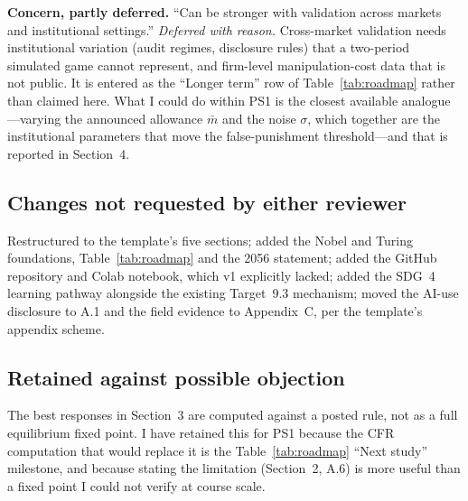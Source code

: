 \textbf{Concern, partly deferred.} ``Can be stronger with validation across
markets and institutional settings.'' \emph{Deferred with reason.} Cross-market
validation needs institutional variation (audit regimes, disclosure rules) that
a two-period simulated game cannot represent, and firm-level manipulation-cost
data that is not public. It is entered as the ``Longer term'' row of
Table~\ref{tab:roadmap} rather than claimed here. What I could do within PS1 is
the closest available analogue---varying the announced allowance $\bar m$ and
the noise $\sigma$, which together are the institutional parameters that move
the false-punishment threshold---and that is reported in Section~4.

\subsection{Changes not requested by either reviewer}
Restructured to the template's five sections; added the Nobel and Turing
foundations, Table~\ref{tab:roadmap} and the 2056 statement; added the GitHub
repository and Colab notebook, which v1 explicitly lacked; added the SDG~4
learning pathway alongside the existing Target~9.3 mechanism; moved the AI-use
disclosure to A.1 and the field evidence to Appendix~C, per the template's
appendix scheme.

\subsection{Retained against possible objection}
The best responses in Section~3 are computed against a posted rule, not as a
full equilibrium fixed point. I have retained this for PS1 because the CFR
computation that would replace it is the Table~\ref{tab:roadmap} ``Next study''
milestone, and because stating the limitation (Section~2, A.6) is more useful
than a fixed point I could not verify at course scale.

\clearpage
